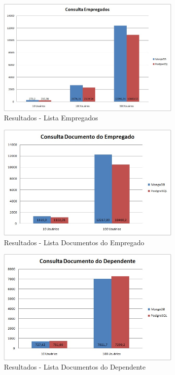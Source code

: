 \begin{figure}[!htbp]
	\begin{center}
		\includegraphics[width=0.8\textwidth]{resultados/consulta_empregados}
	\end{center}
	\caption{Resultados - Lista Empregados}
	\label{fig:resultlistaempregados}
\end{figure}

\begin{figure}[!htbp]
	\begin{center}
		\includegraphics[width=0.8\textwidth]{resultados/consulta_doc_empregado}
	\end{center}
	\caption{Resultados - Lista Documentos do Empregado}
	\label{fig:resultlistadocempregado}
\end{figure}

\begin{figure}[!htbp]
	\begin{center}
		\includegraphics[width=0.8\textwidth]{resultados/consulta_doc_dependente}
	\end{center}
	\caption{Resultados - Lista Documentos do Dependente}
	\label{fig:resultlistadocdependente}
\end{figure}

